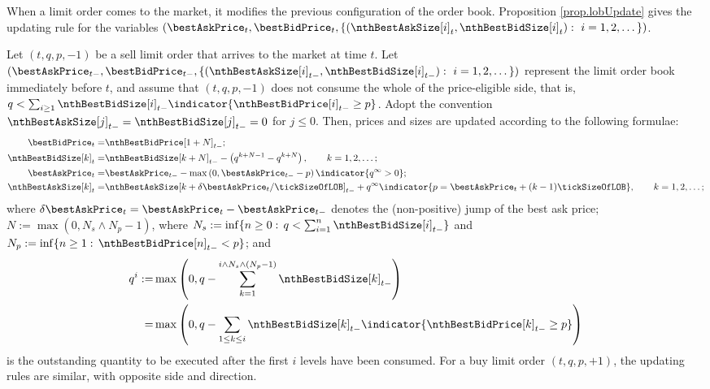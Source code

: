 When a limit order comes to the market,
it modifies the previous configuration of the order book.
Proposition \ref{prop.lobUpdate} gives the updating rule for the variables
$(\bestAskPrice_t, \bestBidPrice_t, \lbrace (\nthBestAskSize[i]_t, \nthBestBidSize[i]_t) : \, \, i=1,2,\dots\rbrace)$.
\begin{prop}
\label{prop.lobUpdate}
 Let $(t,q,p,-1)$ be a sell limit order that arrives to the market at time $t$.
 Let $(\bestAskPrice_{t-}, \bestBidPrice_{t-},\lbrace (\nthBestAskSize[i]_{t-}, \nthBestBidSize[i]_{t-}) : \, \, i=1,2,\dots\rbrace )$
 represent the limit order book immediately before $t$,
 and assume that $(t,q,p,-1)$ does not consume the whole of the price-eligible side,
 that is, $q < \sum_{i\geq1}\nthBestBidSize[i]_{t-}\indicator{\nthBestBidPrice[i]_{t-}\geq p}$.
 Adopt the convention $\nthBestAskSize[j]_{t-} = \nthBestBidSize[j]_{t-} = 0$ for $j \leq 0$.
 Then, prices and sizes are updated according to the following formulae:
 \begin{equation}
 \label{eq.lobUpdateSellOrder}
  \begin{split}
   \bestBidPrice_t =& \nthBestBidPrice[1+N]_{t-};
   \\
   \nthBestBidSize[k]_{t}
   =& \nthBestBidSize[k+N]_{t-}
   - \left( q^{k+N-1}-q^{k+N}\right), \qquad k=1,2,\dots ;
   \\
   \bestAskPrice_t = & \bestAskPrice_{t-}
   - \max\left(0,\bestAskPrice_{t-} - p\right) \indicator{q^{\infty} > 0} ;
   \\
   \nthBestAskSize[k]_t = &  \nthBestAskSize[k+\delta\bestAskPrice_t/\tickSizeOfLOB]_{t-}
   +q^{\infty}\indicator{p=\bestAskPrice_t + (k-1)\tickSizeOfLOB}, \qquad k=1,2,\dots ;
  \end{split}
 \end{equation}
 where $\delta\bestAskPrice_t = \bestAskPrice_t - \bestAskPrice_{t-}$
 denotes the (non-positive) jump of the best ask price;
 $N:=\max(0,N_s \wedge N_p -1)$,
 where $N_s := \inf\lbrace n\geq 0 : \, q<\sum_{i=1}^{n} \nthBestBidSize[i]_{t-}\rbrace$
 and $N_p:=\inf\lbrace n\geq 1: \, \nthBestBidPrice[n]_{t-}< p \rbrace$; and
 \begin{equation*}
  \begin{split}
   q^{i}:=& \max\left( 0,
    q-\sum_{k=1}^{i\wedge N_s \wedge (N_p - 1)} \nthBestBidSize[k]_{t-}
   \right)
   \\
   =& \max\left( 0,
   q-\sum_{1 \leq k\leq i} \nthBestBidSize[k]_{t-}\indicator{\nthBestBidPrice[k]_{t-} \geq p}
   \right)
  \end{split}
 \end{equation*}
 is the outstanding quantity to be executed after the first $i$ levels have been consumed.
 For a buy limit order $(t,q,p,+1)$, the updating rules are similar, with opposite side and direction.
\end{prop}
